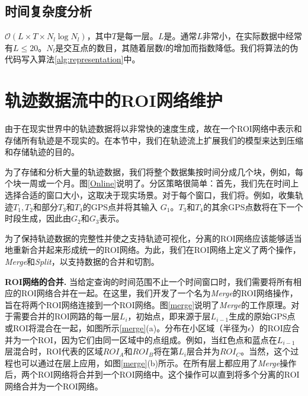 \subsection{时间复杂度分析}
\label{time_complex}
$\mathcal{O}(L\times T\times N_l\log N_l)$，其中$T$是每一层。$L$是。通常$L$非常小，在实际数据中经常有$L\leq20$。$N_l$是交互点的数目，其随着层数$l$的增加而指数降低。我们将算法的伪代码写入算法\ref{alg:representation}中。

\section{轨迹数据流中的ROI网络维护}
由于在现实世界中的轨迹数据将以非常快的速度生成，故在一个ROI网络中表示和存储所有轨迹是不现实的。在本节中，我们在轨迹流上扩展我们的模型来达到压缩和存储轨迹的目的。


为了存储和分析大量的轨迹数据，我们将整个数据集按时间分成几个块，例如，每个块一周或一个月。图\ref{Online}说明了。分区策略很简单：首先，我们先在时间上选择合适的窗口大小，这取决于现实场景。对于每个窗口，我们将。例如，收集轨迹$T_1,T_2$和部分$T_3$和$T_4$的GPS点并将其输入 $G_1$。$T_3$和$T_4$的其余GPS点数将在下一个时段生成，因此由$G_2$和$G_3$表示。

为了保持轨迹数据的完整性并使之支持轨迹可视化，分离的ROI网络应该能够适当地重新合并起来形成统一的ROI网络。为此，我们在ROI网络上定义了两个操作，\emph{Merge}和\emph{Split}，以支持数据的合并和切割。




\vspace{3mm}
\noindent\textbf{ROI网络的合并.}
当给定查询的时间范围不止一个时间窗口时，我们需要将所有相应的ROI网络合并在一起。在这里，我们开发了一个名为\emph{Merge}的ROI网络操作，旨在将两个ROI网络连接到一个ROI网络。图\ref{merge}说明了\emph{Merge}的工作原理。对于需要合并的ROI网路的每一层$L_i$，初始点，即来源于层$L_{i-1}$生成的原始GPS点或ROI将混合在一起，如图所示\ref{merge}(a)。分布在小区域（半径为$\epsilon$）的ROI应合并为一个ROI，因为它们由同一区域中的点组成。例如，当红色点和蓝点在$L_{i-1}$层混合时，ROI代表的区域${ROI}_A$和${ROI}_B$将在第$L_i$层合并为${ROI}_C$。当然，这个过程也可以通过在层上应用，如图\ref{merge}(b)所示。在所有层上都应用了\emph{Merge}操作后，两个ROI网络将合并到一个ROI网络中。这个操作可以直到将多个分离的ROI网络合并为一个ROI网络。

